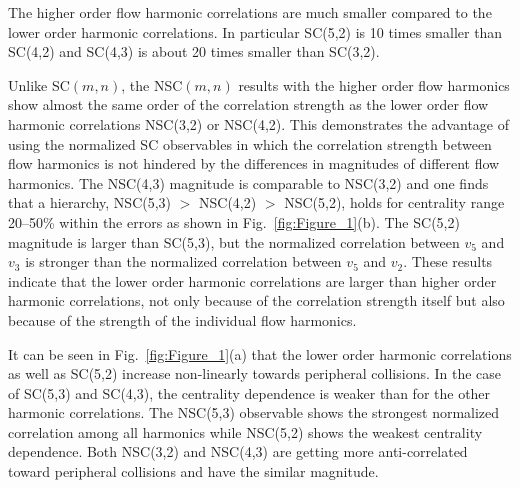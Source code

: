 The higher order flow harmonic correlations are much smaller compared to the lower order harmonic correlations.
In particular SC(5,2) is 10 times smaller than SC(4,2) and SC(4,3) is about 20 times smaller than SC(3,2).

Unlike SC$(m,n)$, the NSC$(m,n)$ results with the higher order flow harmonics show almost the same order of the correlation strength as the lower order flow harmonic correlations NSC(3,2) or NSC(4,2).
This demonstrates the advantage of using the normalized SC observables in which the correlation strength between flow harmonics is not hindered by the differences in magnitudes of different flow harmonics. The NSC(4,3) magnitude is comparable to NSC(3,2) and one finds that a hierarchy, NSC(5,3) $>$ NSC(4,2) $>$ NSC(5,2), holds for centrality range 20--50\% within the errors as shown in Fig.~\ref{fig:Figure_1}(b).
The SC(5,2) magnitude is larger than SC(5,3), but the normalized correlation between $v_5$ and $v_3$ is stronger than the normalized correlation between $v_5$ and $v_2$. 
These results indicate that the lower order harmonic correlations are larger than higher order harmonic correlations, not only because of the correlation strength itself but also because of the strength of the individual flow harmonics.

It can be seen in Fig.~\ref{fig:Figure_1}(a) that the lower order harmonic correlations as well as SC(5,2) increase non-linearly towards peripheral collisions.
In the case of SC(5,3) and SC(4,3), the centrality dependence is weaker than for the other harmonic correlations.
The NSC(5,3) observable shows the strongest normalized correlation among all harmonics while NSC(5,2) shows the weakest centrality dependence.
Both NSC(3,2) and NSC(4,3) are getting more anti-correlated toward peripheral collisions and have the similar magnitude.

